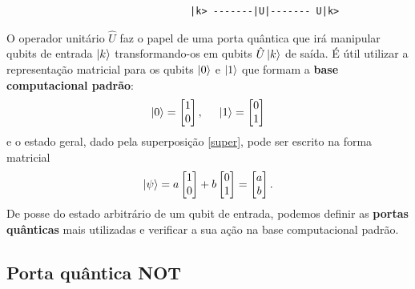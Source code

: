 \documentclass{article}
\begin{document}
\begin{center}
    \begin{verbatim}
                                |k> -------|U|------- U|k> 
    \end{verbatim}
\end{center}
O operador unitário $\hat{U}$ faz o papel de uma porta quântica que irá manipular qubits de entrada $\ket{k}$ transformando-os em qubits $\hat{U}\ket{k}$ de saída. É útil utilizar a representação matricial para os qubits $\ket{0}$ e $\ket{1}$ que formam a \textbf{base computacional padrão}:
\begin{equation}
\ket{0} = 
    \begin{bmatrix}
    1\\
    0
    \end{bmatrix}, 
    \hspace{0.5cm}
    \ket{1} = 
    \begin{bmatrix}
    0\\
    1
    \end{bmatrix}
\end{equation}
e o estado geral, dado pela superposição \eqref{super}, pode ser escrito na forma matricial
\begin{equation}
\ket{\psi} = a \begin{bmatrix}
    1\\
    0
    \end{bmatrix} + b \begin{bmatrix}
    0\\
    1
    \end{bmatrix}
    =
    \begin{bmatrix}
    a\\
    b
    \end{bmatrix}.
\end{equation}
De posse do estado arbitrário de um qubit de entrada, podemos definir as \textbf{portas quânticas} mais utilizadas e verificar a sua ação na base computacional padrão.
 
\subsection{Porta quântica \textbf{NOT}}
\end{document}
